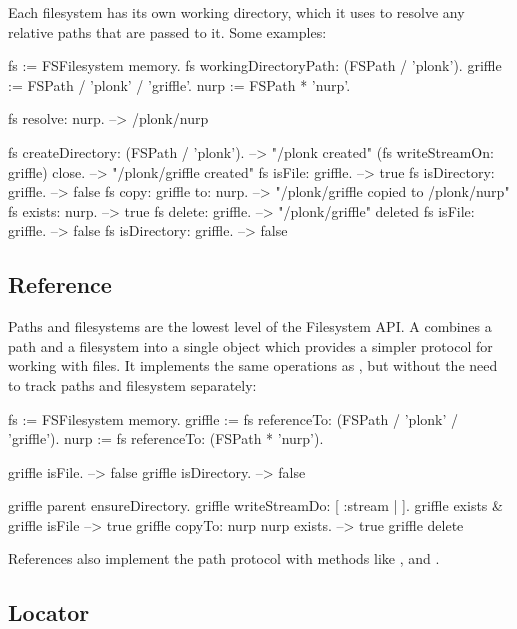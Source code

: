 \documentclass[a4paper,10pt,twoside]{book}
\begin{document}
Each filesystem has its own working directory, which it uses to resolve any relative paths that are passed to it. Some examples:

\begin{code}{}
fs := FSFilesystem memory.
fs workingDirectoryPath: (FSPath / 'plonk').
griffle := FSPath / 'plonk' / 'griffle'.
nurp := FSPath * 'nurp'.
    
fs resolve: nurp.            --> /plonk/nurp
    
fs createDirectory: (FSPath / 'plonk').  --> "/plonk created"
(fs writeStreamOn: griffle) close.  --> "/plonk/griffle created"
fs isFile: griffle.         --> true
fs isDirectory: griffle.         --> false
fs copy: griffle to: nurp.       --> "/plonk/griffle copied to /plonk/nurp"
fs exists: nurp.             --> true
fs delete: griffle.          --> "/plonk/griffle" deleted
fs isFile: griffle.          --> false
fs isDirectory: griffle.         --> false
\end{code}
	
\subsection{Reference}

Paths and filesystems are the lowest level of the Filesystem API. A  combines a path and a filesystem into a single object which provides a simpler protocol for working with files. It implements the same operations as , but without the need to track paths and filesystem separately:


\begin{code}{}
fs := FSFilesystem memory.
griffle := fs referenceTo: (FSPath / 'plonk' / 'griffle').
nurp := fs referenceTo: (FSPath * 'nurp').
    
griffle isFile.				--> false
griffle isDirectory. 		--> false
    
griffle parent ensureDirectory.
griffle writeStreamDo: [ :stream | ].
griffle exists & griffle isFile		--> true
griffle copyTo: nurp
nurp exists.				--> true
griffle delete              
\end{code}    

References also implement the path protocol with methods like \ct{/},  and .

\subsection{Locator}
\end{document}
